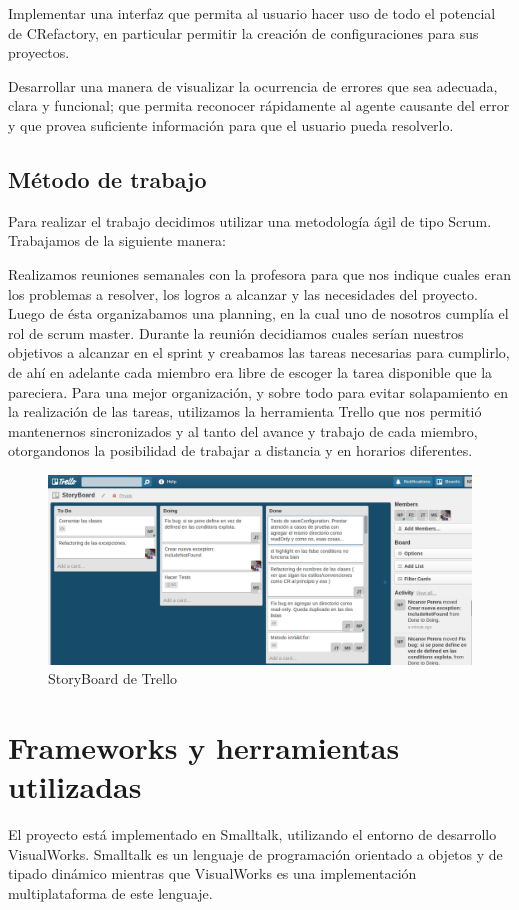 \documentclass[a4paper,oneside,12pt]{article}
\begin{document}
Implementar una interfaz que permita al usuario hacer uso de todo el potencial de CRefactory, en particular permitir la creaci\'on de configuraciones para sus proyectos.

Desarrollar una manera de visualizar la ocurrencia de errores que sea adecuada, clara y funcional; que permita reconocer r\'apidamente al agente causante del error y que provea suficiente informaci\'on para que el usuario pueda resolverlo.

\subsection{M\'etodo de trabajo}

Para realizar el trabajo decidimos utilizar una metodolog\'ia \'agil de tipo Scrum. Trabajamos de la siguiente manera: 

Realizamos reuniones semanales con la profesora para que nos indique cuales eran los problemas a resolver, los logros a alcanzar y las necesidades del proyecto. Luego de \'esta organizabamos una planning, en la cual uno de nosotros cumpl\'ia el rol de scrum master. Durante la reuni\'on decidiamos cuales ser\'ian nuestros objetivos a alcanzar en el sprint y creabamos las tareas necesarias para cumplirlo, de ah\'i en adelante cada miembro era libre de escoger la tarea disponible que la pareciera. Para una mejor organizaci\'on, y sobre todo para evitar solapamiento en la realizaci\'on de las tareas, utilizamos la herramienta Trello que nos permiti\'o mantenernos sincronizados y al tanto del avance y trabajo de cada miembro, otorgandonos la posibilidad de trabajar a distancia y en horarios diferentes.

\begin{figure}[h!]
  \centering
    \includegraphics[scale=0.27]{images/trello.png}
    \caption{StoryBoard de Trello}
    \label{trello}
\end{figure}

\section{Frameworks y herramientas utilizadas}
El proyecto est\'a implementado en Smalltalk, utilizando el entorno de desarrollo VisualWorks. Smalltalk es un lenguaje de programaci\'on orientado a objetos y de tipado din\'amico mientras que VisualWorks es una implementaci\'on multiplataforma de este lenguaje.
\end{document}
